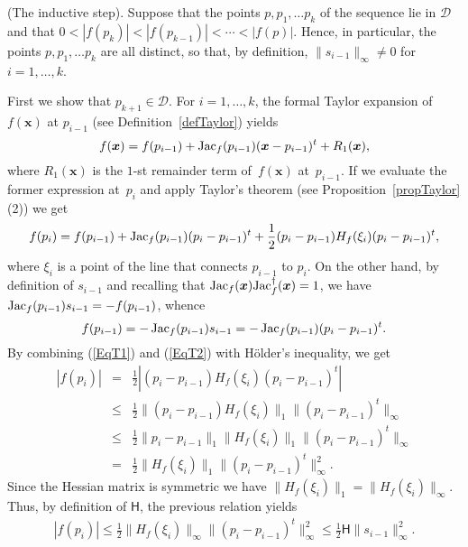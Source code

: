 \documentclass[10pt]{article}
\newcommand{\x}{{\bm x}}
\def\Jac{\mathop{\rm Jac}\nolimits}
\begin{document}
 (The inductive step).  
 Suppose that the points $p,p_1, \ldots p_k$ of the sequence lie in $\mathcal D$
and that $0< |f(p_k)| < |f(p_{k-1})| <  \cdots < |f(p)|$. Hence, in particular, the points $p,p_1, \ldots p_k$ are all distinct, so that, by definition, $\|s_{i-1}\|_\infty\neq 0$ for $i=1,\ldots,k$.

First we show that $p_{k+1} \in \mathcal D$. For $i=1,\ldots,k$,  the formal Taylor expansion of $f(\x)$ at $p_{i-1}$ (see 
Definition~\ref{defTaylor})  yields
$$
f(\x) = f(p_{i-1}) + \Jac_f(p_{i-1}) (\x-p_{i-1})^t + R_1(\x),
$$
where $R_1(\bm x)$ is the $1$-st remainder term of~$f(\x)$ at~$p_{i-1}$.
If we evaluate the former expression at~$p_i$ and apply 
Taylor's theorem (see Proposition~\ref{propTaylor}(2)) we get
\begin{equation}\label{EqT1}
f(p_i) = f(p_{i-1}) + \Jac_f(p_{i-1}) (p_i-p_{i-1})^t + 
\frac{1}{2}(p_i-p_{i-1})H_f(\xi_i) (p_i-p_{i-1})^t,
\end{equation}
where $\xi_i$ is a point of the line that 
connects $p_{i-1}$ to $p_i$.
On the other hand, by definition of $s_{i-1}$ and recalling that ${\rm Jac}_f(\x){\rm Jac}_f^\dagger(\x)=1$,  we have
$\Jac_f(p_{i-1})s_{i-1}=-f(p_{i-1})$, whence 
\begin{equation}\label{EqT2}
f(p_{i-1})=    -\Jac_f(p_{i-1})s_{i-1}=   - \Jac_f(p_{i-1})(p_i-p_{i-1})^t.
\end{equation}
By combining (\ref{EqT1}) and (\ref{EqT2})  with
H\"older's inequality, we get
\begin{eqnarray}\label{idem} \nonumber 
|f(p_i)| &=&  \frac{1}{2}|(p_i-p_{i-1}) H_f(\xi_i)(p_i - p_{i-1})^t| \\ \nonumber
&\le&\frac{1}{2} \|(p_i-p_{i-1}) H_f(\xi_i)\|_1 \|(p_i - p_{i-1})^t\|_\infty \\ \nonumber
&\le& \frac{1}{2} \|p_i-p_{i-1}\|_1  \|H_f(\xi_i)\|_1 \|(p_i - p_{i-1})^t\|_\infty \\ 
&=& \frac{1}{2}  \|H_f(\xi_i)\|_1 \|(p_i - p_{i-1})^t\|_\infty^2.
\end{eqnarray}
Since the Hessian matrix is symmetric we have
$\|H_f(\xi_i)\|_1=\|H_f(\xi_i)\|_\infty$. Thus,  by definition of 
${\mathsf H}$,  the previous relation yields
\begin{eqnarray}\label{ineq1}
|f(p_i)| \le \frac{1}{2}  \|H_f(\xi_i)\|_\infty \|(p_i- p_{i-1})^t\|^2_\infty  
\leq \frac{1}{2} \mathsf H \|s_{i-1}\|_\infty^2.
\end{eqnarray}
\end{document}

